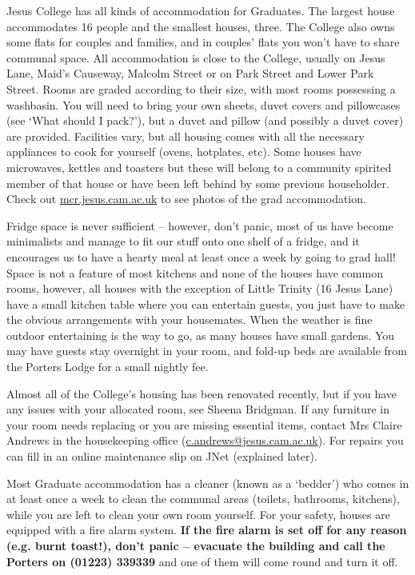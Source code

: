 \documentclass[11pt,fleqn, oneside]{book} %
\begin{document}
Jesus College has all kinds of accommodation for Graduates. The largest house accommodates 16 people and the smallest houses, three. The College also owns some flats for couples and families, and in couples’ flats you won’t have to share communal space.  All accommodation is close to the College, usually on Jesus Lane, Maid’s Causeway, Malcolm Street or on Park Street and Lower Park Street. Rooms are graded according to their size, with most rooms possessing a washbasin. You will need to bring your own sheets, duvet covers and pillowcases (see ‘What should I pack?’), but a duvet and pillow (and possibly a duvet cover) are provided. Facilities vary, but all housing comes with all the necessary appliances to cook for yourself (ovens, hotplates, etc).  Some houses have microwaves, kettles and toasters but these will belong to a community spirited member of that house or have been left behind by some previous householder. Check out \url{mcr.jesus.cam.ac.uk} to see photos of the grad accommodation.

Fridge space is never sufficient – however, don’t panic, most of us have become minimalists and manage to fit our stuff onto one shelf of a fridge, and it encourages us to have a hearty meal at least once a week by going to grad hall!
Space is not a feature of most kitchens and none of the houses have common rooms, however, all houses with the exception of Little Trinity (16 Jesus Lane) have a small kitchen table where you can entertain guests, you just have to make the obvious arrangements with your housemates. When the weather is fine outdoor entertaining is the way to go, as many houses have small gardens. You may have guests stay overnight in your room, and fold-up beds are available from the Porters Lodge for a small nightly fee.

Almost all of the College’s housing has been renovated recently, but if you have any issues with your allocated room, see Sheena Bridgman. If any furniture in your room needs replacing or you are missing essential items, contact Mrs Claire Andrews in the housekeeping office (\url{c.andrews@jesus.cam.ac.uk}). For repairs you can fill in an online maintenance slip on JNet (explained later).

Most Graduate accommodation has a cleaner (known as a ‘bedder’) who comes in at least once a week to clean the communal areas (toilets, bathrooms, kitchens), while you are left to clean your own room yourself. For your safety, houses are equipped with a fire alarm system. \textbf{If the fire alarm is set off for any reason (e.g. burnt toast!), don’t panic – evacuate the building and call the Porters on (01223) 339339} and one of them will come round and turn it off. 
\end{document}
